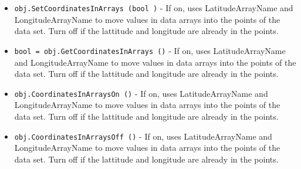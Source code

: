 \begin{itemize}
\item  \verb|obj.SetCoordinatesInArrays (bool )| -  If on, uses LatitudeArrayName and LongitudeArrayName to
 move values in data arrays into the points of the data set.
 Turn off if the lattitude and longitude are already in
 the points.

\item  \verb|bool = obj.GetCoordinatesInArrays ()| -  If on, uses LatitudeArrayName and LongitudeArrayName to
 move values in data arrays into the points of the data set.
 Turn off if the lattitude and longitude are already in
 the points.

\item  \verb|obj.CoordinatesInArraysOn ()| -  If on, uses LatitudeArrayName and LongitudeArrayName to
 move values in data arrays into the points of the data set.
 Turn off if the lattitude and longitude are already in
 the points.

\item  \verb|obj.CoordinatesInArraysOff ()| -  If on, uses LatitudeArrayName and LongitudeArrayName to
 move values in data arrays into the points of the data set.
 Turn off if the lattitude and longitude are already in
 the points.

\end{itemize}
